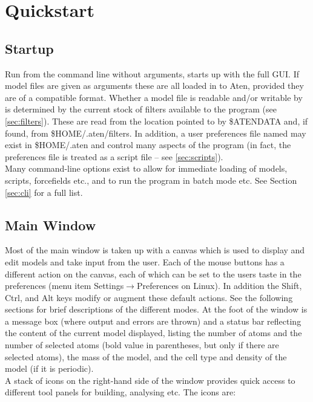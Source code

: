 \chapter{Quickstart}

\section{Startup}
\label{sec:startup}
Run from the command line without arguments, \progname{} starts up with the full GUI. If model files are given as arguments these are all loaded in to Aten, provided they are of a compatible format. Whether a model file is readable and/or writable by \progname{} is determined by the current stock of filters available to the program (see \ref{sec:filters}). These are read from the location pointed to by \$ATENDATA and, if found, from \$HOME/.aten/filters. In addition, a user preferences file named  may exist in \$HOME/.aten and control many aspects of the program (in fact, the preferences file is treated as a script file -- see \ref{sec:scripts}).\\

Many command-line options exist to allow for immediate loading of models, scripts, forcefields etc., and to run the program in batch mode etc. See Section \ref{sec:cli} for a full list.\\

\section{Main Window}
Most of the main window is taken up with a canvas which is used to display and edit models and take input from the user. Each of the mouse buttons has a different action on the canvas, each of which can be set to the users taste in the preferences (menu item Settings$\rightarrow$Preferences on Linux). In addition the Shift, Ctrl, and Alt keys modify or augment these default actions. See the following sections for brief descriptions of the different modes. At the foot of the window is a message box (where output and errors are thrown) and a status bar reflecting the content of the current model displayed, listing the number of atoms and the number of selected atoms (bold value in parentheses, but only if there are selected atoms), the mass of the model, and the cell type and density of the model (if it is periodic).\\

A stack of icons on the right-hand side of the window provides quick access to different tool panels for building, analysing etc. The icons are:\\

